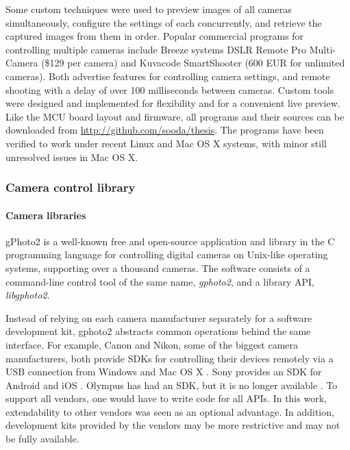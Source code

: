 Some custom techniques were used to preview images of all cameras simultaneously, configure the settings of each concurrently, and retrieve the captured images from them in order.
Popular commercial programs for controlling multiple cameras include Breeze systems DSLR Remote Pro Multi-Camera \cite{breezesystemsmulti} (\$129 per camera) and Kuvacode SmartShooter \cite{smartshooter} (600 EUR for unlimited cameras).
Both advertise features for controlling camera settings, and remote shooting with a delay of over 100 milliseconds between cameras.
Custom tools were designed and implemented for flexibility and for a convenient live preview.
Like the MCU board layout and firmware, all programs and their sources can be downloaded from \url {http://github.com/sooda/thesis}.
The programs have been verified to work under recent Linux and Mac OS X systems, with minor still unresolved issues in Mac OS X.


\subsubsection{Camera control library} %

\paragraph{Camera libraries}
gPhoto2 \cite{gphoto2} is a well-known free and open-source application and library in the C programming language for controlling digital cameras on Unix-like operating systems, supporting over a thousand cameras.
The software consists of a command-line control tool of the same name, \emph{gphoto2}, and a library API, \emph{libgphoto2}.

Instead of relying on each camera manufacturer separately for a software development kit, gphoto2 abstracts common operations behind the same interface.
For example, Canon and Nikon, some of the biggest camera manufacturers, both provide SDKs for controlling their devices remotely via a USB connection from Windows and Mac OS X \cite{canonedsdk,nikonsdk}.
Sony provides an SDK for Android and iOS \cite{sonysdk}.
Olympus has had an SDK, but it is no longer available \cite{olympussdk}.
To support all vendors, one would have to write code for all APIs.
In this work, extendability to other vendors was seen as an optional advantage.
In addition, development kits provided by the vendors may be more restrictive and may not be fully available.

